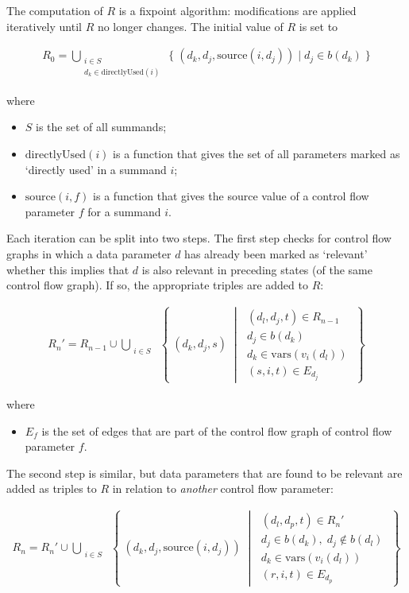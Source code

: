 The computation of $R$ is a fixpoint algorithm: modifications are applied iteratively until $R$ no longer changes.
The initial value of $R$ is set to

\begin{align*}
R_0 = \bigcup\limits_{\substack{i \in S \\ d_k \in \text{directlyUsed}(i)}}^{} \;\{\; (d_k, d_j, \text{source}(i, d_j)) \;|\; d_j \in b(d_k) \;\}
\end{align*}

where

\begin{itemize}
\item $S$ is the set of all summands;
\item $\text{directlyUsed}(i)$ is a function that gives the set of all parameters marked as `directly used' in a summand $i$;
\item $\text{source}(i, f)$ is a function that gives the source value of a control flow parameter $f$ for a summand $i$.
\end{itemize}

Each iteration can be split into two steps.
The first step checks for control flow graphs in which a data parameter $d$ has already been marked as `relevant' whether this implies that $d$ is also relevant in preceding states (of the same control flow graph).
If so, the appropriate triples are added to $R$:

\begin{align*}
R_{n}{'} = R_{n-1} \cup \bigcup\limits_{\substack{i \in S}}^{} \;\left\{\; (d_k, d_j, s) \;\middle|\; \substack{(d_l, d_j, t) \in R_{n-1} \\ d_j \in b(d_k) \\ d_k \in \text{vars}(v_i(d_l)) \\ (s, i, t) \in E_{d_j}} \;\right\}
\end{align*}

where

\begin{itemize}
\item $E_{f}$ is the set of edges that are part of the control flow graph of control flow parameter $f$.
\end{itemize}

The second step is similar, but data parameters that are found to be relevant are added as triples to $R$ in relation to \emph{another} control flow parameter:

\begin{align*}
R_{n} = R_{n}{'} \cup \bigcup\limits_{\substack{i \in S}}^{} \;\left\{\; (d_k, d_j, \text{source}(i, d_j)) \;\middle|\; \substack{(d_l, d_p, t) \in R_{n}{'} \\ d_j \in b(d_k),\; d_j \notin b(d_l) \\ d_k \in \text{vars}(v_i(d_l)) \\ (r, i, t) \in E_{d_p}} \;\right\}
\end{align*}

